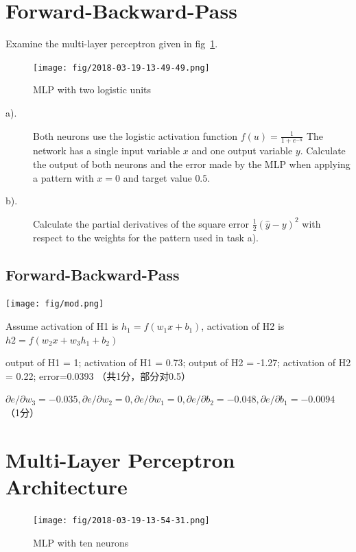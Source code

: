 \documentclass[12pt]{article}
\begin{document}
\section{Forward-Backward-Pass}
Examine the multi-layer perceptron given in fig~\ref{fig:mlp}.

\begin{figure}[!htbp]
	\centering
	\texttt{[image: fig/2018-03-19-13-49-49.png]}
	\caption{MLP with two logistic units} \label{fig:mlp}
\end{figure}

\begin{description}
	\item[a).]	Both neurons use the logistic activation function
	      $f(u)=\frac{1}{1+e^{-u}}$
	      The network has
	      a single input variable $x$ and one output variable $y$. Calculate the output of both
	      neurons and the error made by the MLP when applying a pattern with $x = 0$ and
	      target value $0.5$.
	\item[b).] Calculate the partial derivatives of the
	      square error $\frac{1}{2}(\hat{y} -y)^2$
	      with respect to the weights for the pattern used in task a).
\end{description}

\subsection{Forward-Backward-Pass}

\texttt{[image: fig/mod.png]}

Assume activation of H1 is $h_1=f(w_1x+b_1)$, activation of H2 is $h2=f(w_2x+w_3 h_1+b_2)$

output of H1 = 1; activation of H1 = 0.73; output of H2 = -1.27; activation of H2 = 0.22; 	error=0.0393 （共1分，部分对0.5）

$\partial e/\partial w_3 = -0.035, \partial e/\partial w_2 = 0, \partial e/\partial w_1 = 0, \partial e / \partial b_2 = -0.048, \partial e / \partial b_1 =   -0.0094$
（1分）


\section{Multi-Layer Perceptron Architecture}

\begin{figure}[!htbp]
	\centering
	\texttt{[image: fig/2018-03-19-13-54-31.png]}
	\caption{MLP with ten neurons} \label{fig:mlp2}
\end{figure}
\end{document}
